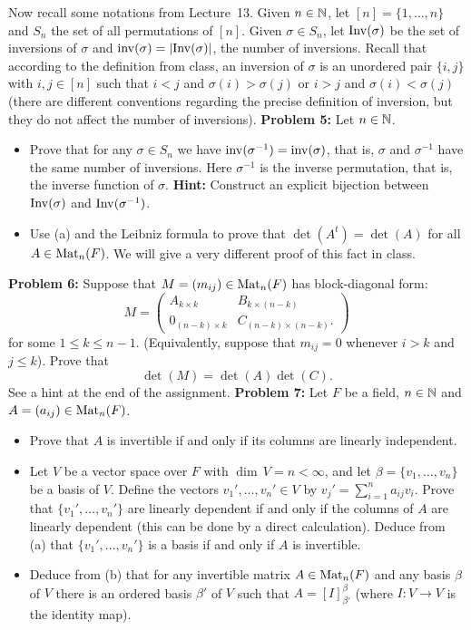 \documentclass[11pt]{amsart}
\begin{document}
Now recall some notations from Lecture~13. Given $n\in{\mathbb N}$, let $[n]=\{1,\ldots, n\}$ and $S_n$
 the set of all permutations of $[n]$. Given $\sigma\in S_n$, let ${\rm Inv}(\sigma)$ be the set of inversions
 of $\sigma$ and ${\rm inv}(\sigma)=|{\rm Inv}(\sigma)|$, the number of inversions. Recall that according to the definition
 from class, an inversion of $\sigma$ is an unordered pair $\{i,j\}$ with $i,j\in [n]$ such that
 $i<j$ and $\sigma(i)>\sigma(j)$ or $i>j$ and $\sigma(i)<\sigma(j)$ (there are different conventions regarding
the precise definition of inversion, but they do not affect the number of inversions).
\skv
 {\bf Problem 5: } Let $n\in{\mathbb N}$.
 \begin{itemize}
 \item[(a)] Prove that for any $\sigma\in S_n$ we have ${\rm inv}(\sigma^{-1})={\rm inv}(\sigma)$, that is,
 $\sigma$ and $\sigma^{-1}$ have the same number of inversions. Here $\sigma^{-1}$ is the inverse permutation,
that is, the inverse function of $\sigma$. {\bf Hint:} Construct an explicit bijection between ${\rm Inv}(\sigma)$ 
and ${\rm Inv}(\sigma^{-1})$.
\item[(b)] Use (a) and the Leibniz formula to prove that $\det(A^t)=\det(A)$ for all $A\in {\rm Mat}_n(F)$. We will
give a very different proof of this fact in class.
\end{itemize}
\skv
\skv
{\bf Problem 6:} Suppose that $M=(m_{ij})\in {\rm Mat}_{n}(F)$ has block-diagonal form:
$$M=\begin{pmatrix} A_{k\times k} &B_{k\times (n-k)} \\ 0_{(n-k)\times k} & 
C_{(n-k)\times (n-k)}.
\end{pmatrix}$$
for some $1\leq k\leq n-1$. (Equivalently, suppose that $m_{ij}=0$ whenever $i>k$ and $j\leq k$).
Prove that $$\det(M)=\det(A)\det(C).$$ See a hint at the end of the assignment.
\skv
{\bf Problem 7:} Let $F$ be a field, $n\in{\mathbb N}$ and $A=(a_{ij})\in {\rm Mat}_{n}(F)$.
\begin{itemize}
\item[(a)] Prove that $A$ is invertible
if and only if its columns are linearly independent.
\item[(b)] Let $V$ be a vector space over $F$ with $\dim\, V=n<\infty$,
and let $\beta=\{v_1,\ldots, v_n\}$ be a basis of $V$. Define the vectors $v_1',\ldots, v_n'\in V$
by $v_j'=\sum_{i=1}^n a_{ij}v_i$. Prove that $\{v_1',\ldots, v_n'\}$ are linearly dependent if
and only if the columns of $A$ are linearly dependent (this can be done by a direct calculation).
Deduce from (a) that $\{v_1',\ldots, v_n'\}$ is a basis if and only if
$A$ is invertible. 
\item[(c)] Deduce from (b) that for any invertible matrix $A\in {\rm Mat}_{n}(F)$
and any basis $\beta$ of $V$
there is an ordered basis $\beta'$ of $V$ such that $A=[I]_{\beta'}^{\beta}$
(where $I:V\to V$ is the  identity map).
\end{itemize}
\end{document}
